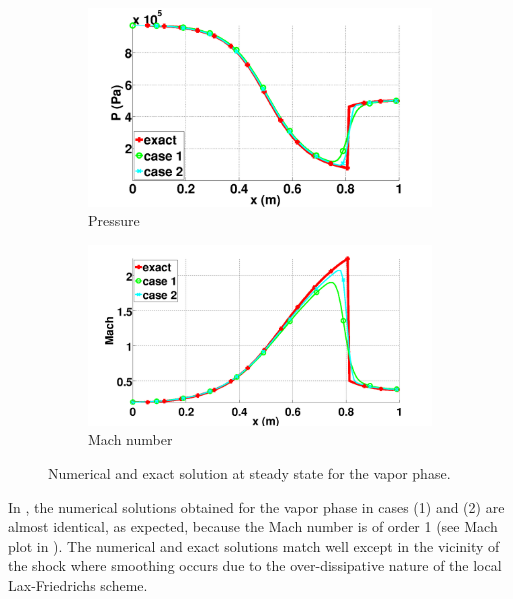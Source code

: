\begin{figure}[H]
        \begin{subfigure}[b]{0.495\textwidth}
                \centering
                \includegraphics[width=\textwidth]{figures/vapor_pressure_llf_and_exact_100.png}
                \caption{Pressure}
                \label{fig:vap-phase-press}
        \end{subfigure}        
        \begin{subfigure}[b]{0.495\textwidth}
                \centering
                \includegraphics[width=\textwidth]{figures/vapor_mach_llf_and_exact_100.png}
                \caption{Mach number}
                \label{fig:vap-phase-mach}
        \end{subfigure}
        \caption{Numerical and exact solution at steady state for the vapor phase.}\label{fig:vap-phase}
\end{figure}
%
In , the numerical solutions obtained for the vapor phase in cases (1) and (2) are almost identical, as expected, because the Mach number is of order 1
(see Mach plot in ). The numerical and exact solutions match  well except in the vicinity of the shock where smoothing occurs due to the over-dissipative nature of the local Lax-Friedrichs scheme. 
